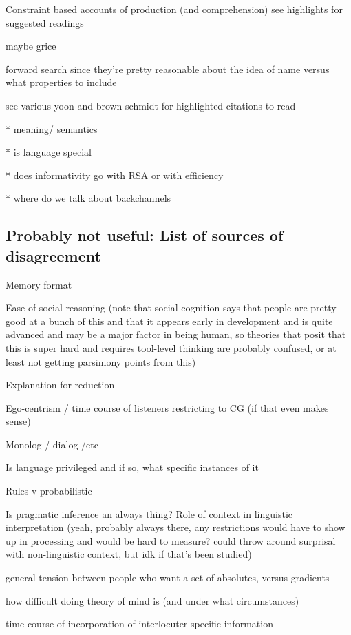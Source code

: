 \documentclass[]{article}
\begin{document}
Constraint based accounts of production (and comprehension) see \cite{hanna2003} highlights for suggested readings

maybe grice

forward search \cite{heller2012} since they're pretty reasonable about the idea of name versus what properties to include 


see various yoon and brown schmidt for highlighted citations to read 


* meaning/ semantics

* is language special 

* does informativity go with RSA or with efficiency 

* where do we talk about backchannels 


\subsection{Probably not useful: List of sources of disagreement}

Memory format 

Ease of social reasoning (note that social cognition says that people are pretty good at a bunch of this and that it appears early in development and is quite advanced and may be a major factor in being human, so theories that posit that this is super hard and requires tool-level thinking are probably confused, or at least not getting parsimony points from this)

Explanation for reduction

Ego-centrism / time course of listeners restricting to CG (if that even makes sense)

Monolog / dialog /etc 

Is language privileged and if so, what specific instances of it

Rules v probabilistic

Is pragmatic inference an always thing? Role of context in linguistic interpretation (yeah, probably always there, any restrictions would have to show up in processing and would be hard to measure? could throw around surprisal with non-linguistic context, but idk if that's been studied) 

general tension between people who want a set of absolutes, versus gradients

how difficult doing theory of mind is (and under what circumstances)

time course of incorporation of interlocuter specific information 
\end{document}
